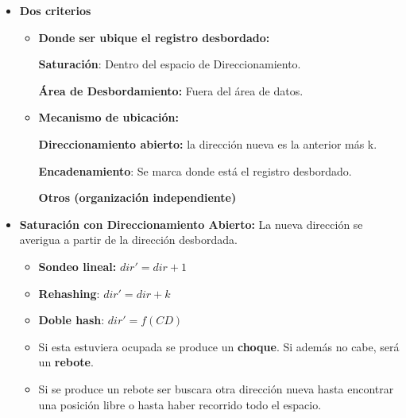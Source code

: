 \documentclass[12pt, twoside, openright]{report} %
\begin{document}
\begin{itemize}
      \begin{itemize}
      \item \textbf{Dos criterios}
        

        \begin{itemize}
        \item \textbf{Donde ser ubique el registro desbordado:}
          

       
		  
            \textbf{Saturación}: Dentro del espacio de Direccionamiento.
          
			
            \textbf{Área de Desbordamiento:} Fuera del área de datos.
            
			
        \item \textbf{Mecanismo de ubicación:}
          

          
            \textbf{Direccionamiento abierto:} la dirección nueva es la
            anterior más k.
           
			
            \textbf{Encadenamiento}: Se marca donde está el registro
            desbordado.
           
			
            \textbf{Otros (organización independiente)}
          
			
        \end{itemize}
      \item \textbf{Saturación con Direccionamiento Abierto:} La nueva
        dirección se averigua a partir de la dirección desbordada.
        

        \begin{itemize}
        \item \textbf{Sondeo lineal:} $dir'= dir+1$
          
        \item \textbf{Rehashing}: $dir'= dir+k$
          
        \item \textbf{Doble hash}: $dir'=f(CD)$
          
        \end{itemize}

        \begin{itemize}
        \item Si esta estuviera ocupada se produce un \textbf{choque}. Si
          además no cabe, será un \textbf{rebote}.
          
        \item Si se produce un rebote ser buscara otra dirección nueva hasta
          encontrar una posición libre o hasta haber recorrido todo el
          espacio.
          

\end{itemize}
\end{itemize}
\end{itemize}
\end{document}
